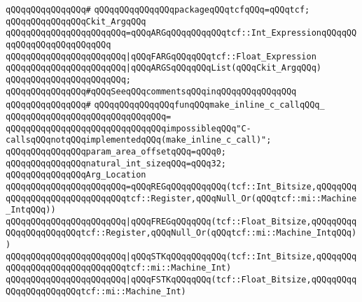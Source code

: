\verb|qQQqqQQqqQQqqQQq#|\newline
\verb|qQQqqQQqqQQqqQQqpackageqQQqtcfqQQq=qQQqtcf;|\newline
\newline
\verb|qQQqqQQqqQQqqQQqCkit_ArgqQQq|\newline
\verb|qQQqqQQqqQQqqQQqqQQqqQQq=qQQqARGqQQqqQQqqQQqtcf::Int_ExpressionqQQqqQQqqQQqqQQqqQQqqQQqqQQq|\newline
\verb|qQQqqQQqqQQqqQQqqQQqqQQq|\verb#|qQQqFARGqQQqqQQqtcf::Float_Expression#\newline
\verb|qQQqqQQqqQQqqQQqqQQqqQQq|\verb#|qQQqARGSqQQqqQQqList(qQQqCkit_ArgqQQq)#\newline
\verb|qQQqqQQqqQQqqQQqqQQqqQQq;|\newline
\newline
\verb|qQQqqQQqqQQqqQQq#qQQqSeeqQQqcommentsqQQqinqQQqqQQqqQQqqQQq|\newline
\verb|qQQqqQQqqQQqqQQq#|\newline
\verb|qQQqqQQqqQQqqQQqfunqQQqmake_inline_c_callqQQq_|\newline
\verb|qQQqqQQqqQQqqQQqqQQqqQQqqQQqqQQq=|\newline
\verb|qQQqqQQqqQQqqQQqqQQqqQQqqQQqqQQqimpossibleqQQq"C-callsqQQqnotqQQqimplementedqQQq(make_inline_c_call)";|\newline
\newline
\verb|qQQqqQQqqQQqqQQqparam_area_offsetqQQq=qQQq0;|\newline
\newline
\verb|qQQqqQQqqQQqqQQqnatural_int_sizeqQQq=qQQq32;|\newline
\newline
\verb|qQQqqQQqqQQqqQQqArg_Location|\newline
\verb|qQQqqQQqqQQqqQQqqQQqqQQq=qQQqREGqQQqqQQqqQQq(tcf::Int_Bitsize,qQQqqQQqqQQqqQQqqQQqqQQqqQQqqQQqtcf::Register,qQQqNull_Or(qQQqtcf::mi::Machine_IntqQQq))|\newline
\verb|qQQqqQQqqQQqqQQqqQQqqQQq|\verb#|qQQqFREGqQQqqQQq(tcf::Float_Bitsize,qQQqqQQqqQQqqQQqqQQqqQQqtcf::Register,qQQqNull_Or(qQQqtcf::mi::Machine_IntqQQq))#\newline
\verb|qQQqqQQqqQQqqQQqqQQqqQQq|\verb#|qQQqSTKqQQqqQQqqQQq(tcf::Int_Bitsize,qQQqqQQqqQQqqQQqqQQqqQQqqQQqqQQqtcf::mi::Machine_Int)#\newline
\verb|qQQqqQQqqQQqqQQqqQQqqQQq|\verb#|qQQqFSTKqQQqqQQq(tcf::Float_Bitsize,qQQqqQQqqQQqqQQqqQQqqQQqtcf::mi::Machine_Int)#\newline

